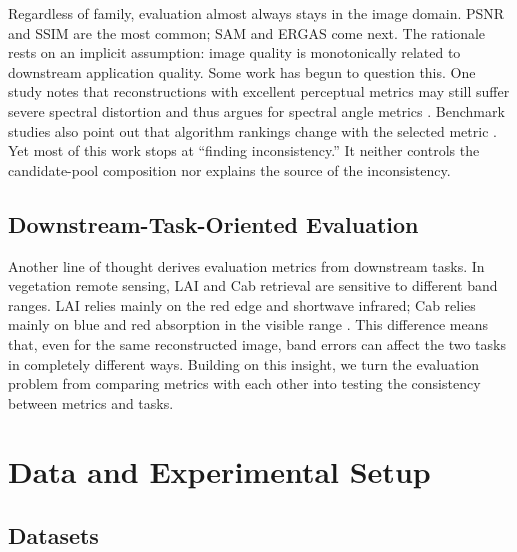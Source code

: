 \documentclass[a4paper,fleqn]{cas-dc}
\begin{document}
Regardless of family, evaluation almost always stays in the image domain. PSNR and SSIM are the most common; SAM and ERGAS come next. The rationale rests on an implicit assumption: image quality is monotonically related to downstream application quality. Some work has begun to question this. One study notes that reconstructions with excellent perceptual metrics may still suffer severe spectral distortion and thus argues for spectral angle metrics \cite{ref9}. Benchmark studies also point out that algorithm rankings change with the selected metric \cite{ref10,ref11}. Yet most of this work stops at ``finding inconsistency.'' It neither controls the candidate-pool composition nor explains the source of the inconsistency.

\subsection{Downstream-Task-Oriented Evaluation}

Another line of thought derives evaluation metrics from downstream tasks. In vegetation remote sensing, LAI and Cab retrieval are sensitive to different band ranges. LAI relies mainly on the red edge and shortwave infrared; Cab relies mainly on blue and red absorption in the visible range \cite{ref22,ref23,ref24}. This difference means that, even for the same reconstructed image, band errors can affect the two tasks in completely different ways. Building on this insight, we turn the evaluation problem from comparing metrics with each other into testing the consistency between metrics and tasks.

\section{Data and Experimental Setup}

\subsection{Datasets}\label{sec:data}
\end{document}
